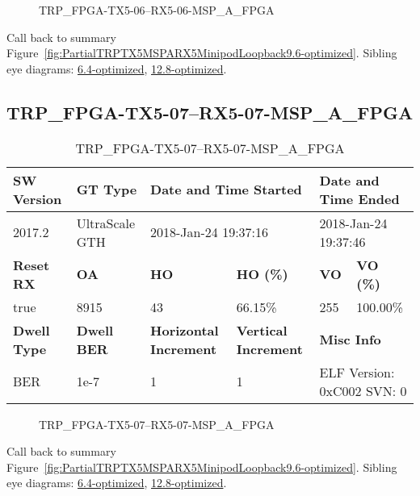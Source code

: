 \begin{figure}[h]
\caption{TRP\_FPGA-TX5-06--RX5-06-MSP\_A\_FPGA} \label{fig:TRPFPGATX506RX506MSPAFPGA9.6-optimized}
\end{figure}

Call back to summary Figure~\ref{fig:PartialTRPTX5MSPARX5MinipodLoopback9.6-optimized}.
Sibling eye diagrams: \hyperref[sec:TRPFPGATX506RX506MSPAFPGA6.4-optimized]{6.4-optimized}, \hyperref[sec:TRPFPGATX506RX506MSPAFPGA12.8-optimized]{12.8-optimized}.

\clearpage
\newpage


\subsection{TRP\_FPGA-TX5-07--RX5-07-MSP\_A\_FPGA}\label{sec:TRPFPGATX507RX507MSPAFPGA9.6-optimized}

\begin{table}[h]
\centering
\caption{TRP\_FPGA-TX5-07--RX5-07-MSP\_A\_FPGA}
\label{tab:TRPFPGATX507RX507MSPAFPGA9.6-optimized}
\begin{tabular}{@{}|l|l|l|l|l|l|@{}}
\toprule
\textbf{SW Version}                & \textbf{GT Type}   & \multicolumn{2}{l|}{\textbf{Date and Time Started}}            & \multicolumn{2}{l|}{\textbf{Date and Time Ended}}        \\ \midrule
2017.2                       & UltraScale GTH          & \multicolumn{2}{l|}{2018-Jan-24 19:37:16}                   & \multicolumn{2}{l|}{2018-Jan-24 19:37:46}               \\ \midrule
\textbf{Reset RX}                  & \textbf{OA} & \textbf{HO}   & \textbf{HO (\%)} & \textbf{VO} & \textbf{VO (\%)} \\ \midrule
true & 8915        & 43          & 66.15\%        & 255        & 100.00\%       \\ \midrule
\textbf{Dwell Type}                & \textbf{Dwell BER} & \textbf{Horizontal Increment} & \textbf{Vertical Increment}    & \multicolumn{2}{l|}{\textbf{Misc Info}}                  \\ \midrule
BER                            & 1e-7        & 1        & 1           & \multicolumn{2}{l|}{ELF Version: 0xC002 SVN: 0}                         \\ \bottomrule
\end{tabular}
\end{table}

\begin{figure}[h]
\caption{TRP\_FPGA-TX5-07--RX5-07-MSP\_A\_FPGA} \label{fig:TRPFPGATX507RX507MSPAFPGA9.6-optimized}
\end{figure}

Call back to summary Figure~\ref{fig:PartialTRPTX5MSPARX5MinipodLoopback9.6-optimized}.
Sibling eye diagrams: \hyperref[sec:TRPFPGATX507RX507MSPAFPGA6.4-optimized]{6.4-optimized}, \hyperref[sec:TRPFPGATX507RX507MSPAFPGA12.8-optimized]{12.8-optimized}.

\clearpage
\newpage

